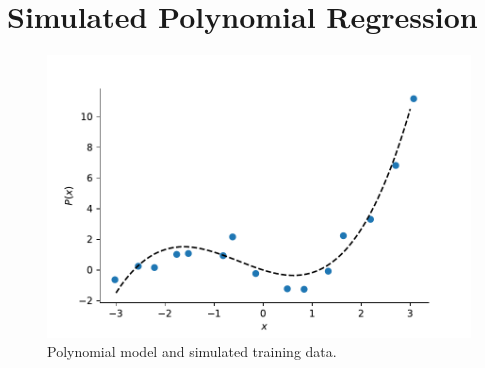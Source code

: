 \chapter{Simulated Polynomial Regression } \label{apx:simulated-joint}

\begin{figure}[htbp]
    \centering
    \includegraphics{Figures/pol_model.pdf}
    \caption{Polynomial model and simulated training data.}
    \label{fig:pol-model}
\end{figure}

